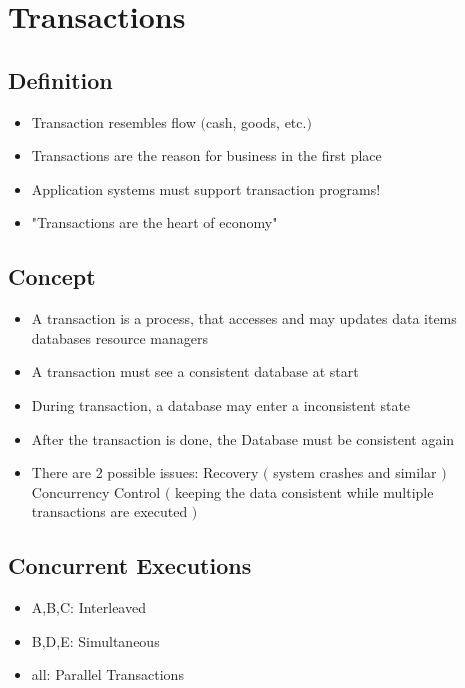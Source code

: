 \chapter{Transactions}
	\section{Definition}
		\begin{itemize}
			\item Transaction resembles flow $($cash, goods, etc.$)$
			\item Transactions are the reason for business in the first place
			\item Application systems must support transaction programs!
			\item \color{red}"Transactions are the heart of economy"\color{black}
		\end{itemize}
			
	
	\section{Concept}
		\begin{itemize}
			\item A transaction is a process, that accesses and may updates data items
				\subitem databases 
				\subitem resource managers
			\item A transaction must see a consistent database at start
			\item During transaction, a database may enter a inconsistent state
			\item After the transaction is done, the Database must be consistent again
			\item There are 2 possible issues:
			\subitem Recovery $($ system crashes and similar $)$ 
			\subitem Concurrency Control $($ keeping the data consistent while multiple transactions are executed $)$
		\end{itemize}
	
	\newpage
	\section{Concurrent Executions}
		\begin{itemize}
			\item A,B,C: Interleaved
			\item B,D,E: Simultaneous
			\item all: Parallel Transactions			
		\end{itemize}
	
